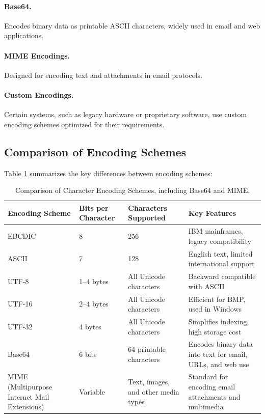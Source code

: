     \paragraph{Base64.} Encodes binary data as printable ASCII characters, widely used in email and web applications.
    \paragraph{MIME Encodings.} Designed for encoding text and attachments in email protocols.
    \paragraph{Custom Encodings.} Certain systems, such as legacy hardware or proprietary software, use custom encoding schemes optimized for their requirements.


\subsection{Comparison of Encoding Schemes}

Table \ref{tab:char_encodings} summarizes the key differences between encoding schemes:

\begin{table}[h!]
\centering
\renewcommand{\arraystretch}{1.3} %
\setlength{\tabcolsep}{5pt} %
\begin{tabular}{|p{3.5cm}|p{2cm}|p{3.5cm}|p{5cm}|} %
\hline
\textbf{Encoding Scheme} & \textbf{Bits per Character} & \textbf{Characters Supported} & \textbf{Key Features} \\ \hline
EBCDIC & 8 & 256 & IBM mainframes, legacy compatibility \\ \hline
ASCII & 7 & 128 & English text, limited international support \\ \hline
UTF-8 & 1--4 bytes & All Unicode characters & Backward compatible with ASCII \\ \hline
UTF-16 & 2--4 bytes & All Unicode characters & Efficient for BMP, used in Windows \\ \hline
UTF-32 & 4 bytes & All Unicode characters & Simplifies indexing, high storage cost \\ \hline
Base64 & 6 bits & 64 printable characters & Encodes binary data into text for email, URLs, and web use \\ \hline
MIME (Multipurpose Internet Mail Extensions) & Variable & Text, images, and other media types & Standard for encoding email attachments and multimedia \\ \hline
\end{tabular}
\caption{Comparison of Character Encoding Schemes, including Base64 and MIME.}
\label{tab:char_encodings}
\end{table}

